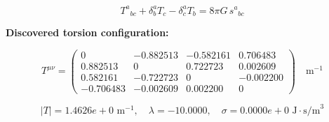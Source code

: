 
\begin{equation}
  T^a{}_{bc} + \delta^a_b T_c - \delta^a_c T_b = 8\pi G \, s^a{}_{bc}
\end{equation}

\textbf{Discovered torsion configuration:}

\begin{equation}
  T^{\mu\nu} = \begin{pmatrix}
    0 & -0.882513 & -0.582161 & 0.706483 \\
    0.882513 & 0 & 0.722723 & 0.002609 \\
    0.582161 & -0.722723 & 0 & -0.002200 \\
    -0.706483 & -0.002609 & 0.002200 & 0
  \end{pmatrix} \quad \text{m}^{-1}
\end{equation}

\begin{equation}
  |T| = 1.4626e+0 \text{ m}^{-1}, \quad
  \lambda = -10.0000, \quad
  \sigma = 0.0000e+0 \text{ J}\cdot\text{s/m}^3
\end{equation}